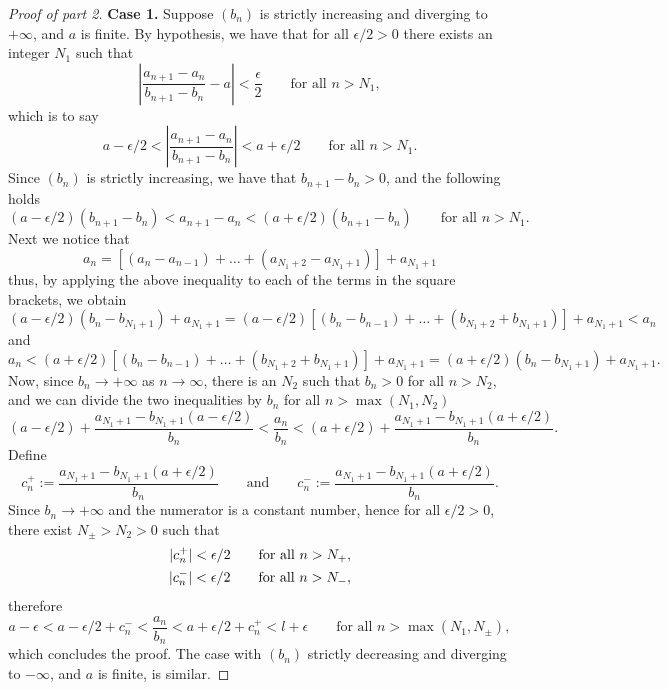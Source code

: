 \begin{proof}[Proof of part 2]
  \phantom{.}

  \textbf{Case 1.} Suppose $(b_n)$ is strictly increasing and
  diverging to $+\infty$, and $a$ is finite. By hypothesis, we have
  that for all $\epsilon / 2 > 0$ there exists an integer $N_1$ such that
  \[ \left|\frac{a_{n + 1} - a_n}{b_{n + 1} - b_n} - a\right| <
  \frac{\epsilon}{2} \qquad \text{for all $n > N_1$}, \]
  which is to say
  \[ a - \epsilon / 2 < \left|\frac{a_{n + 1} - a_n}{b_{n + 1} -
  b_n}\right| < a + \epsilon / 2 \qquad \text{for all $n > N_1$}. \]
  Since $(b_n)$ is strictly increasing, we have that $b_{n + 1} - b_n
  > 0$, and the following holds
  \[ (a - \epsilon / 2)(b_{n + 1} - b_n) < a_{n + 1} - a_n < (a +
  \epsilon / 2)(b_{n + 1} - b_n) \qquad \text{for all $n > N_1$}. \]
  Next we notice that
  \[ a_n = [(a_n - a_{n - 1}) + \dots + (a_{N_1 + 2} - a_{N_1 + 1})]
  + a_{N_1 + 1} \]
  thus, by applying the above inequality to each of the terms in the
  square brackets, we obtain
  \[ (a - \epsilon / 2)(b_n - b_{N_1 + 1}) + a_{N_1 + 1} = (a - \epsilon
    / 2)[(b_n - b_{n - 1}) + \dots + (b_{N_1 + 2} + b_{N_1 + 1})] +
  a_{N_1 + 1} < a_n \]
  and
  \[ a_n < (a + \epsilon / 2)[(b_n - b_{n - 1}) + \dots + (b_{N_1 + 2}
    + b_{N_1 + 1})] + a_{N_1 + 1} = (a + \epsilon / 2)(b_n - b_{N_1 + 1}) +
  a_{N_1 + 1}. \]
  Now, since $b_n \to +\infty$ as $n \to \infty$, there is an $N_2$
  such that $b_n > 0$ for all $n > N_2$, and we can divide the two
  inequalities by $b_n$ for all $n > \max(N_1, N_2)$
  \[ (a - \epsilon / 2) + \frac{a_{N_1 + 1} - b_{N_1 + 1} (a - \epsilon /
    2)}{b_n} < \frac{a_n}{b_n} < (a + \epsilon / 2) + \frac{a_{N_1 + 1} -
  b_{N_1 + 1} (a + \epsilon / 2)}{b_n}. \]
  Define
  \[ c_n^+ := \frac{a_{N_1 + 1} - b_{N_1 + 1} (a + \epsilon / 2)}{b_n}
    \qquad \text{and} \qquad c_n^- := \frac{a_{N_1 + 1} - b_{N_1 + 1} (a +
  \epsilon / 2)}{b_n}. \]
  Since $b_n \to +\infty$ and the numerator is a constant number,
  hence for all $\epsilon / 2 > 0$, there exist $N_{\pm} > N_2 > 0$ such that
  \begin{align*}
    | c_n^+ | < \epsilon / 2 \qquad \text{for all $n > N_+$}, \\
    | c_n^- | < \epsilon / 2 \qquad \text{for all $n > N_-$},
  \end{align*}
  therefore
  \[ a - \epsilon < a - \epsilon / 2 + c_n^- < \frac{a_n}{b_n} < a +
    \epsilon / 2 + c_n^+ < l + \epsilon \qquad \text{for all $n >
  \max(N_1, N_{\pm})$}, \]
  which concludes the proof. The case with $(b_n)$ strictly
  decreasing and diverging to $-\infty$, and $a$ is finite, is similar.


\end{proof}
